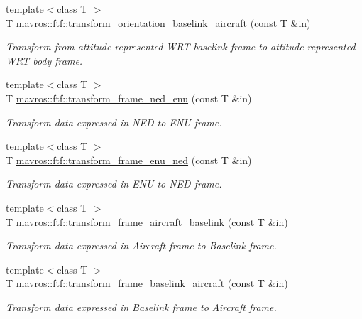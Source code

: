 \begin{DoxyCompactItemize}
{\footnotesize template$<$class T $>$ }\\T \mbox{\hyperlink{group__nodelib_ga52af05306da40938392b1536064458af}{mavros\+::ftf\+::transform\+\_\+orientation\+\_\+baselink\+\_\+aircraft}} (const T \&in)
\begin{DoxyCompactList}\small\item\em Transform from attitude represented W\+RT baselink frame to attitude represented W\+RT body frame. \end{DoxyCompactList}\item 
{\footnotesize template$<$class T $>$ }\\T \mbox{\hyperlink{group__nodelib_ga190188b4899aab8fde4d65de949535c9}{mavros\+::ftf\+::transform\+\_\+frame\+\_\+ned\+\_\+enu}} (const T \&in)
\begin{DoxyCompactList}\small\item\em Transform data expressed in N\+ED to E\+NU frame. \end{DoxyCompactList}\item 
{\footnotesize template$<$class T $>$ }\\T \mbox{\hyperlink{group__nodelib_ga789377f76104cb6f7665ad368dbba1c9}{mavros\+::ftf\+::transform\+\_\+frame\+\_\+enu\+\_\+ned}} (const T \&in)
\begin{DoxyCompactList}\small\item\em Transform data expressed in E\+NU to N\+ED frame. \end{DoxyCompactList}\item 
{\footnotesize template$<$class T $>$ }\\T \mbox{\hyperlink{group__nodelib_gad724ac71858730a830ae77b9dd480aaf}{mavros\+::ftf\+::transform\+\_\+frame\+\_\+aircraft\+\_\+baselink}} (const T \&in)
\begin{DoxyCompactList}\small\item\em Transform data expressed in Aircraft frame to Baselink frame. \end{DoxyCompactList}\item 
{\footnotesize template$<$class T $>$ }\\T \mbox{\hyperlink{group__nodelib_ga8e8a38a1f75dd0007204a206a6745193}{mavros\+::ftf\+::transform\+\_\+frame\+\_\+baselink\+\_\+aircraft}} (const T \&in)
\begin{DoxyCompactList}\small\item\em Transform data expressed in Baselink frame to Aircraft frame. \end{DoxyCompactList}\item 

\end{DoxyCompactItemize}
